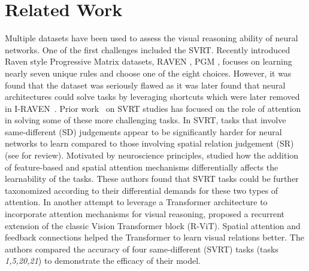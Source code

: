 \section{Related Work}
\label{sec:relwork}

Multiple datasets have been used to assess the visual reasoning ability of neural networks. One of the first challenges included the SVRT. Recently introduced Raven style Progressive Matrix datasets, RAVEN \citep{zhang2019raven}, PGM \citet{barrett2018measuring}, focuses on learning nearly seven unique rules and choose one of the eight choices. However, it was found that the dataset was seriously flawed as it was later found that neural architectures could solve tasks by leveraging shortcuts \citep{hu2020hierarchical,spratley2020closer} which were later removed in I-RAVEN~\citep{hu2021stratified}. Prior work~\citep{kim2018not,vaishnav2021understanding,messina2021recurrent} on SVRT studies has focused on the role of attention in solving some of these more challenging tasks. In SVRT, tasks that involve same-different (SD) judgements appear to be significantly harder for neural networks to learn compared to those involving spatial relation judgement (SR) \citep{stabinger201625,Yihe2019ProgramSP,kim2018not} (see \citet{ricci37same} for review). Motivated by neuroscience principles, \citet{vaishnav2021understanding} studied how the addition of feature-based and spatial attention mechanisms differentially affects the learnability of the tasks. These authors found that SVRT tasks could be further taxonomized according to their differential demands for these two types of attention. In another attempt to leverage a Transformer architecture to incorporate attention mechanisms for visual reasoning,  \citet{messina2021recurrent} proposed a recurrent extension of the classic Vision Transformer block (R-ViT). Spatial attention and feedback connections helped the Transformer to learn visual relations better. The authors compared the accuracy of four same-different (SVRT) tasks (tasks \textit{1,5,20,21}) to demonstrate the efficacy of their model. 

